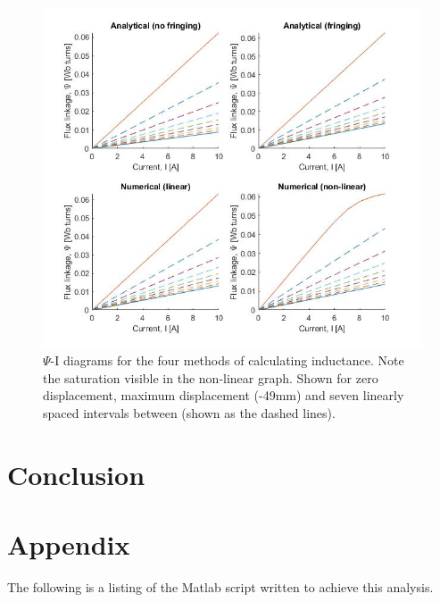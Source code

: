 \documentclass[a4paper]{IEEEtran}
\begin{document}
\begin{figure}[ht]
\includegraphics[width = \linewidth]{psi-I-diagrams.jpg}
\caption{$\Psi$-I diagrams for the four methods of calculating inductance. Note the saturation visible in the non-linear graph. Shown for zero displacement, maximum displacement (-49mm) and seven linearly spaced intervals between (shown as the dashed lines).}
\label{inductanceGraph} 
\end{figure}


\section{Conclusion}

\pagebreak
\onecolumn
\section{Appendix}
The following is a listing of the Matlab script written to achieve this analysis.

\end{document}
